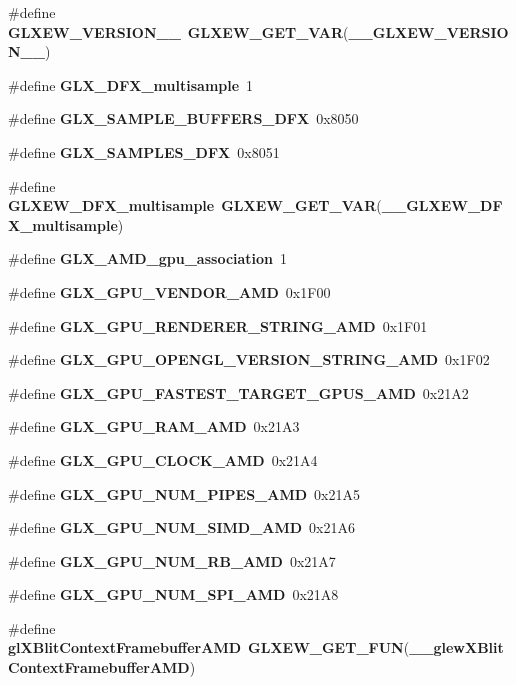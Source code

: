 \begin{DoxyCompactItemize}
\item 
\#define {\bf G\+L\+X\+E\+W\+\_\+\+V\+E\+R\+S\+I\+O\+N\+\_\+\_}~{\bf G\+L\+X\+E\+W\+\_\+\+G\+E\+T\+\_\+\+V\+AR}({\bf \+\_\+\+\_\+\+G\+L\+X\+E\+W\+\_\+\+V\+E\+R\+S\+I\+O\+N\+\_\+\_})
\item 
\#define {\bf G\+L\+X\+\_\+D\+F\+X\+\_\+multisample}~1
\item 
\#define {\bf G\+L\+X\+\_\+\+S\+A\+M\+P\+L\+E\+\_\+\+B\+U\+F\+F\+E\+R\+S\+\_\+D\+FX}~0x8050
\item 
\#define {\bf G\+L\+X\+\_\+\+S\+A\+M\+P\+L\+E\+S\+\_\+D\+FX}~0x8051
\item 
\#define {\bf G\+L\+X\+E\+W\+\_\+D\+F\+X\+\_\+multisample}~{\bf G\+L\+X\+E\+W\+\_\+\+G\+E\+T\+\_\+\+V\+AR}({\bf \+\_\+\+\_\+\+G\+L\+X\+E\+W\+\_\+D\+F\+X\+\_\+multisample})
\item 
\#define {\bf G\+L\+X\+\_\+\+A\+M\+D\+\_\+gpu\+\_\+association}~1
\item 
\#define {\bf G\+L\+X\+\_\+\+G\+P\+U\+\_\+\+V\+E\+N\+D\+O\+R\+\_\+\+A\+MD}~0x1\+F00
\item 
\#define {\bf G\+L\+X\+\_\+\+G\+P\+U\+\_\+\+R\+E\+N\+D\+E\+R\+E\+R\+\_\+\+S\+T\+R\+I\+N\+G\+\_\+\+A\+MD}~0x1\+F01
\item 
\#define {\bf G\+L\+X\+\_\+\+G\+P\+U\+\_\+\+O\+P\+E\+N\+G\+L\+\_\+\+V\+E\+R\+S\+I\+O\+N\+\_\+\+S\+T\+R\+I\+N\+G\+\_\+\+A\+MD}~0x1\+F02
\item 
\#define {\bf G\+L\+X\+\_\+\+G\+P\+U\+\_\+\+F\+A\+S\+T\+E\+S\+T\+\_\+\+T\+A\+R\+G\+E\+T\+\_\+\+G\+P\+U\+S\+\_\+\+A\+MD}~0x21\+A2
\item 
\#define {\bf G\+L\+X\+\_\+\+G\+P\+U\+\_\+\+R\+A\+M\+\_\+\+A\+MD}~0x21\+A3
\item 
\#define {\bf G\+L\+X\+\_\+\+G\+P\+U\+\_\+\+C\+L\+O\+C\+K\+\_\+\+A\+MD}~0x21\+A4
\item 
\#define {\bf G\+L\+X\+\_\+\+G\+P\+U\+\_\+\+N\+U\+M\+\_\+\+P\+I\+P\+E\+S\+\_\+\+A\+MD}~0x21\+A5
\item 
\#define {\bf G\+L\+X\+\_\+\+G\+P\+U\+\_\+\+N\+U\+M\+\_\+\+S\+I\+M\+D\+\_\+\+A\+MD}~0x21\+A6
\item 
\#define {\bf G\+L\+X\+\_\+\+G\+P\+U\+\_\+\+N\+U\+M\+\_\+\+R\+B\+\_\+\+A\+MD}~0x21\+A7
\item 
\#define {\bf G\+L\+X\+\_\+\+G\+P\+U\+\_\+\+N\+U\+M\+\_\+\+S\+P\+I\+\_\+\+A\+MD}~0x21\+A8
\item 
\#define {\bf gl\+X\+Blit\+Context\+Framebuffer\+A\+MD}~{\bf G\+L\+X\+E\+W\+\_\+\+G\+E\+T\+\_\+\+F\+UN}({\bf \+\_\+\+\_\+glew\+X\+Blit\+Context\+Framebuffer\+A\+MD})

\end{DoxyCompactItemize}

